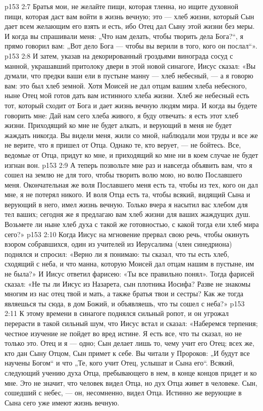 \vs p153 2:7 Братья мои, не желайте пищи, которая тленна, но ищите духовной пищи, которая даст вам войти в жизнь вечную; это --- хлеб жизни, который Сын дает всем желающим его взять и есть, ибо Отец дал Сыну этой жизни без меры. И когда вы спрашивали меня: „Что нам делать, чтобы творить дела Бога?“, я прямо говорил вам: „Вот дело Бога --- чтобы вы верили в того, кого он послал“».
\vs p153 2:8 И затем, указав на декорированный гроздьями винограда сосуд с манной, украшавший притолоку двери в этой новой синагоге, Иисус сказал: «Вы думали, что предки ваши ели в пустыне манну --- хлеб небесный, --- а я говорю вам: это был хлеб земной. Хотя Моисей не дал отцам вашим хлеба небесного, ныне Отец мой готов дать вам истинного хлеба жизни. Хлеб же небесный есть тот, который сходит от Бога и дает жизнь вечную людям мира. И когда вы будете говорить мне: Дай нам сего хлеба живого, я буду отвечать: я есть этот хлеб жизни. Приходящий ко мне не будет алкать, и верующий в меня не будет жаждать никогда. Вы видели меня, жили со мной, наблюдали мои труды и все же не верите, что я пришел от Отца. Однако те, кто верует, --- не бойтесь. Все, ведомые от Отца, придут ко мне, и приходящий ко мне ни в коем случае не будет изгнан вон.
\vs p153 2:9 А теперь позвольте мне раз и навсегда объявить вам, что я сошел на землю не для того, чтобы творить волю мою, но волю Пославшего меня. Окончательная же воля Пославшего меня есть та, чтобы из тех, кого он дал мне, я не потерял никого. И воля Отца есть та, чтобы всякий, видящий Сына и верующий в него, имел жизнь вечную. Только вчера я насытил вас хлебом для тел ваших; сегодня же я предлагаю вам хлеб жизни для ваших жаждущих душ. Возьмете ли ныне хлеб духа с такой же готовностью, с какой тогда ели хлеб мира сего?»
\vs p153 2:10 \pc Когда Иисус на мгновение прервал свою речь, чтобы окинуть взором собравшихся, один из учителей из Иерусалима (член синедриона) поднялся и спросил: «Верно ли я понимаю: ты сказал, что ты есть хлеб, сходящий с неба, и что манна, которую Моисей дал отцам нашим в пустыне, им не была?» И Иисус ответил фарисею: «Ты все правильно понял». Тогда фарисей сказал: «Не ты ли Иисус из Назарета, сын плотника Иосифа? Разве не знакомы многим из нас отец твой и мать, а также братья твои и сестры? Как же тогда являешься ты сюда, в дом Божий, и объявляешь, что ты сошел с неба?»
\vs p153 2:11 К этому времени в синагоге поднялся сильный ропот, и он угрожал перерасти в такой сильный шум, что Иисус встал и сказал: «Наберемся терпения; честное изучение не пойдет во вред истине. Я есть все, что ты сказал, но не только это. Отец и я --- одно; Сын делает лишь то, чему учит его Отец; всех же, кто дан Сыну Отцом, Сын примет к себе. Вы читали у Пророков: „И будут все научены Богом“ и что „Те, кого учит Отец, услышат и Сына его“. Всякий, следующий учению духа Отца, пребывающего в нем, в конце концов придет и ко мне. Это не значит, что человек видел Отца, но дух Отца живет в человеке. Сын, сошедший с небес, --- он, несомненно, видел Отца. Истинно же верующие в Сына сего уже имеют жизнь вечную.
